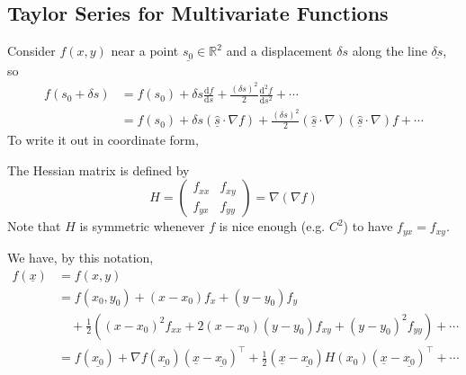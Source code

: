 \subsection{Taylor Series for Multivariate Functions}
Consider $f(x,y)$ near a point $\underline{s_0}\in\mathbb R^2$ and a displacement $\delta s$ along the line $\underline{\delta s}$, so
\begin{align*}
    f(s_0+\delta s)&=f(s_0)+\delta s\frac{\mathrm df}{\mathrm ds}+\frac{(\delta s)^2}{2}\frac{\mathrm d^2f}{\mathrm ds^2}+\cdots\\
    &=f(s_0)+\delta s(\underline{\hat s}\cdot\nabla f)+\frac{(\delta s)^2}{2}(\underline{\hat{s}}\cdot\nabla)(\underline{\hat s}\cdot\nabla)f+\cdots
\end{align*}
To write it out in coordinate form,
\begin{definition}
    The Hessian matrix is defined by
    $$H=
    \begin{pmatrix}
        f_{xx}&f_{xy}\\
        f_{yx}&f_{yy}
    \end{pmatrix}=\nabla(\nabla f)$$
    Note that $H$ is symmetric whenever $f$ is nice enough (e.g. $C^2$) to have $f_{yx}=f_{xy}$.
\end{definition}
We have, by this notation,
\begin{align*}
    f(\underline{x})&=f(x,y)\\
    &=f(x_0,y_0)+(x-x_0)f_x+(y-y_0)f_y\\
    &\quad+\frac{1}{2}((x-x_0)^2f_{xx}+2(x-x_0)(y-y_0)f_{xy}+(y-y_0)^2f_{yy})+\cdots\\
    &=f(\underline{x_0})+\nabla f(\underline{x_0})(\underline{x}-\underline{x_0})^\top+\frac{1}{2}(\underline{x}-\underline{x_0}) H(x_0)(\underline{x}-\underline{x_0})^\top+\cdots
\end{align*}
